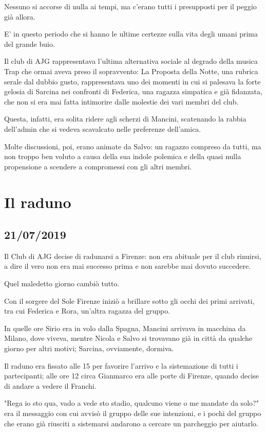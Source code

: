 Nessuno si accorse di nulla ai tempi, ma c’erano tutti i presupposti per il peggio già allora.

E' in questo periodo che si hanno le ultime certezze sulla vita degli umani prima del grande buio.

Il club di AJG rappresentava l'ultima alternativa sociale al degrado della musica Trap che ormai aveva preso il sopravvento: La Proposta della Notte, una rubrica serale dal dubbio gusto, rappresentava uno dei momenti in cui si palesava la forte gelosia di Sarcina nei confronti di Federica, una ragazza simpatica e già fidanzata, che non si era mai fatta intimorire dalle molestie dei vari membri del club.

Questa, infatti, era solita ridere agli scherzi di Mancini, scatenando la rabbia dell'admin che si vedeva scavalcato nelle preferenze dell'amica.

Molte discussioni, poi, erano animate da Salvo: un ragazzo compreso da tutti, ma non troppo ben voluto a causa della sua indole polemica e della quasi nulla propensione a scendere a compromessi con gli altri membri.

\section{Il raduno}
\subsection*{21/07/2019}



Il Club di AJG decise di radunarsi a Firenze: non era abituale per il club rinuirsi, a dire il vero non era mai successo prima e non sarebbe mai dovuto succedere.

Quel maledetto giorno cambiò tutto.

Con il sorgere del Sole Firenze iniziò a brillare sotto gli occhi dei primi arrivati, tra cui Federica e Rora, un'altra ragazza del gruppo. 

In quelle ore Sirio era in volo dalla Spagna, Mancini arrivava in macchina da Milano, dove viveva, mentre Nicola e Salvo si trovavano già in città da qualche giorno per altri motivi; Sarcina, ovviamente, dormiva.

Il raduno era fissato alle 15 per favorire l'arrivo e la sistemazione di tutti i partecipanti; alle ore 12 circa Gianmarco era alle porte di Firenze, quando decise di andare a vedere il Franchi. 

"Rega io sto qua, vado a vede sto stadio, qualcuno viene o me mandate da solo?" era il messaggio con cui avvisò il gruppo delle sue intenzioni, e i pochi del gruppo che erano già riusciti a sistemarsi andarono a cercare un parcheggio per aiutarlo.

